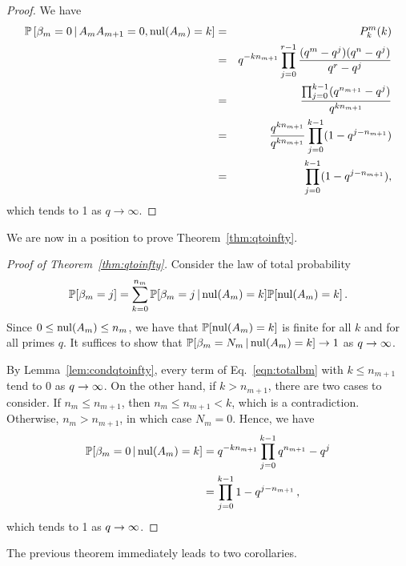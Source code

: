 \begin{proof}
We have
	\begin{eqnarray*}
	\mathbb{P}\left[\beta_m = 0 \,|\, A_{m}A_{m+1} = 0, \mathrm{nul}(A_{m}) = k \right]
    &=& P^m_k(k)\\
    &=& q^{-kn_{m+1}}\prod_{j=0}^{r-1} \frac{(q^m-q^j) (q^n - q^j)}{q^r - q^j}  \\
		&=& \frac{\prod_{j=0}^{k-1}(q^{n_{m+1}} - q^j)}
		{q^{kn_{m+1}}} \\
		&=& \frac{q^{kn_{m+1}}}{q^{kn_{m+1}}}\prod_{j=0}^{k-1}(1-q^{j-n_{m+1}})\\
		&=& \prod_{j=0}^{k-1} (1-q^{j-n_{m+1}}),
	\end{eqnarray*}
which tends to 1 as $q\to\infty$.  
\end{proof}

We are now in a position to prove Theorem~\ref{thm:qtoinfty}.

\begin{proof}[Proof of Theorem~\ref{thm:qtoinfty}]
  Consider the law of total probability
  \begin{equation}
    \label{eqn:totalbm}
    \mathbb{P}[\beta_m = j] = \sum_{k=0}^{n_m} \mathbb{P}[\beta_m = j \,|\, \mathrm{nul}(A_m) = k]
    \mathbb{P}[\mathrm{nul}(A_m) = k] \, .
  \end{equation}
   Since $0 \leq \mathrm{nul}(A_m) \leq n_m$, we have that $\mathbb{P}[\mathrm{nul}(A_m) = k]$ is
   finite for all $k$ and for all primes $q$.  It suffices to show that 
   $\mathbb{P}[\beta_m =N_m \,|\, \mathrm{nul}(A_m) = k] \rightarrow 1$ as $q \rightarrow \infty$.
   
   By Lemma~\ref{lem:condqtoinfty}, every
   term of Eq.~\eqref{eqn:totalbm} with $k\leq n_{m+1}$ tend to 0 as $q \rightarrow \infty$.
   On the other hand, if $k>n_{m+1}$, there are two cases to consider.
   If $n_m \leq n_{m+1}$, then $n_m \leq n_{m+1} < k$, which is a contradiction.
   Otherwise, $n_m > n_{m+1}$, in which case $N_m = 0$. Hence, we have
   \begin{align*}
     \mathbb{P}[\beta_m = 0 \,|\, \mathrm{nul}(A_m) = k] &= q^{-k n_{m+1}} \prod_{j=0}^{k-1}q^{n_{m+1}}-q^j \\
     &= \prod_{j=0}^{k-1} 1 - q^{j-n_{m+1}} \, ,
   \end{align*}
   which tends to 1 as $q \rightarrow \infty$.
 \end{proof}




  



The previous theorem immediately leads to two corollaries.  

